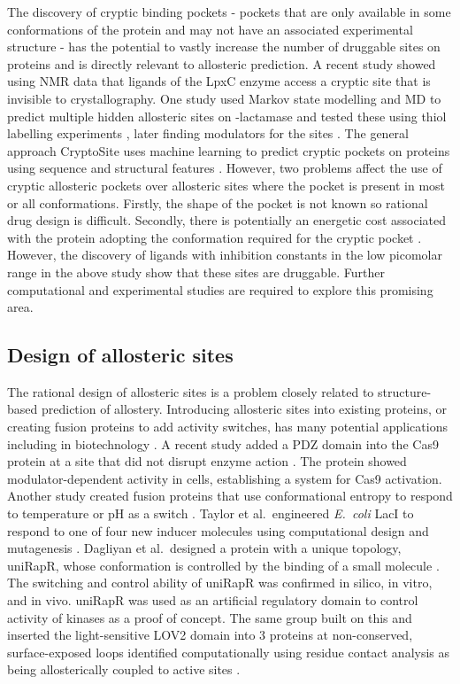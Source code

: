 The discovery of cryptic binding pockets - pockets that are only available in some conformations of the protein and may not have an associated experimental structure - has the potential to vastly increase the number of druggable sites on proteins \cite{Boehr2009} and is directly relevant to allosteric prediction.
A recent study \cite{Lee2016} showed using NMR data that ligands of the LpxC enzyme access a cryptic site that is invisible to crystallography.
One study used Markov state modelling and MD to predict multiple hidden allosteric sites on \textbeta -lactamase and tested these using thiol labelling experiments \cite{Bowman2015}, later finding modulators for the sites \cite{Hart2017}.
The general approach CryptoSite uses machine learning to predict cryptic pockets on proteins using sequence and structural features \cite{Cimermancic2016}.
However, two problems affect the use of cryptic allosteric pockets over allosteric sites where the pocket is present in most or all conformations.
Firstly, the shape of the pocket is not known so rational drug design is difficult.
Secondly, there is potentially an energetic cost associated with the protein adopting the conformation required for the cryptic pocket \cite{Oleinikovas2016}.
However, the discovery of ligands with inhibition constants in the low picomolar range in the above study \cite{Lee2016} show that these sites are druggable.
Further computational and experimental studies are required to explore this promising area.


\subsection{Design of allosteric sites}

The rational design of allosteric sites is a problem closely related to structure-based prediction of allostery.
Introducing allosteric sites into existing proteins, or creating fusion proteins to add activity switches, has many potential applications including in biotechnology \cite{Makhlynets2015}.
A recent study added a PDZ domain into the Cas9 protein at a site that did not disrupt enzyme action \cite{Oakes2016}.
The protein showed modulator-dependent activity in cells, establishing a system for Cas9 activation.
Another study created fusion proteins that use conformational entropy to respond to temperature or pH as a switch \cite{Choi2015}.
Taylor et al.\ engineered \textit{E.\ coli} LacI to respond to one of four new inducer molecules using computational design and mutagenesis \cite{Taylor2016}.
Dagliyan et al.\ designed a protein with a unique topology, uniRapR, whose conformation is controlled by the binding of a small molecule \cite{Dagliyan2013}.
The switching and control ability of uniRapR was confirmed in silico, in vitro, and in vivo.
uniRapR was used as an artificial regulatory domain to control activity of kinases as a proof of concept.
The same group built on this and inserted the light-sensitive LOV2 domain into 3 proteins at non-conserved, surface-exposed loops identified computationally using residue contact analysis as being allosterically coupled to active sites \cite{Dagliyan2016}.


